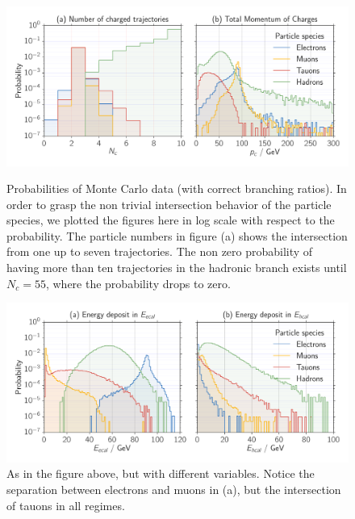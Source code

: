 \begin{figure}[htpb]
    \centering
    \includegraphics[width=1.0\linewidth]{figures/N_p_c}
    \caption{Probabilities of Monte Carlo data (with correct branching ratios). 
        In order to grasp the non trivial intersection behavior of the particle species, we plotted the figures here
    in log scale with respect to the probability. The particle numbers in figure (a) shows the 
intersection from one up to seven trajectories. The non zero probability of having more than ten trajectories in the hadronic
branch exists until $N_c = 55$, where the probability drops to zero. }
\label{fig:monte1}
    \includegraphics[width=1.0\linewidth]{figures/E_cal}
    \caption{As in the figure above, but with different variables. Notice the separation between electrons
    and muons in (a), but the intersection of tauons in all regimes.}
\label{fig:monte2}
\end{figure}

\clearpage
